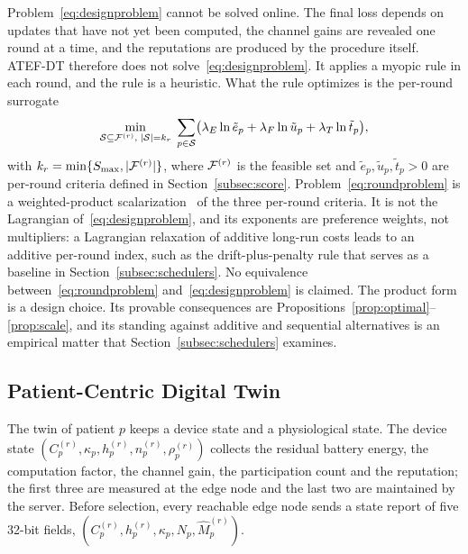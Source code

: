 \begin{revblock}Problem~\eqref{eq:designproblem} cannot be solved online. The final loss depends on updates that have not yet been computed, the channel gains are revealed one round at a time, and the reputations are produced by the procedure itself. ATEF-DT therefore does not solve~\eqref{eq:designproblem}. It applies a myopic rule in each round, and the rule is a heuristic. What the rule optimizes is the per-round surrogate
\begin{equation}
	\min_{\mathcal{S}\subseteq\mathcal{F}^{(r)},\;|\mathcal{S}|=k_r}\;\sum_{p\in\mathcal{S}}\bigl(\lambda_E\ln\tilde e_p+\lambda_F\ln\tilde u_p+\lambda_T\ln\tilde t_p\bigr),
	\label{eq:roundproblem}
\end{equation}
with $k_r=\min\{S_{\max},|\mathcal{F}^{(r)}|\}$, where $\mathcal{F}^{(r)}$ is the feasible set and $\tilde e_p,\tilde u_p,\tilde t_p>0$ are per-round criteria defined in Section~\ref{subsec:score}. Problem~\eqref{eq:roundproblem} is a weighted-product scalarization~\cite{marler2004survey} of the three per-round criteria. It is not the Lagrangian of~\eqref{eq:designproblem}, and its exponents are preference weights, not multipliers: a Lagrangian relaxation of additive long-run costs leads to an additive per-round index, such as the drift-plus-penalty rule that serves as a baseline in Section~\ref{subsec:schedulers}. No equivalence between~\eqref{eq:roundproblem} and~\eqref{eq:designproblem} is claimed. The product form is a design choice. Its provable consequences are Propositions~\ref{prop:optimal}--\ref{prop:scale}, and its standing against additive and sequential alternatives is an empirical matter that Section~\ref{subsec:schedulers} examines.\end{revblock}

\subsection{Patient-Centric Digital Twin}
\label{subsec:twin}
The twin of patient $p$ keeps a device state and a physiological state. The device state $(C_p^{(r)},\kappa_p,h_p^{(r)},n_p^{(r)},\rho_p^{(r)})$ collects the residual battery energy, the computation factor, the channel gain, the participation count and the reputation; the first three are measured at the edge node and the last two are maintained by the server. Before selection, every reachable edge node sends a state report of five 32-bit fields, $(C_p^{(r)},h_p^{(r)},\kappa_p,N_p,\widehat{M}_p^{(r)})$.


